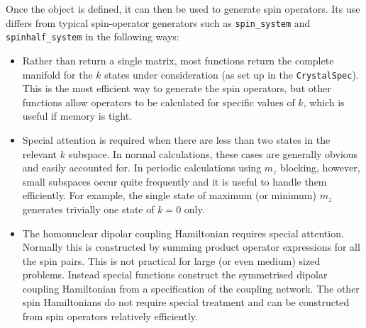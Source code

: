 \documentclass[11pt,a4paper]{article}
\begin{document}
Once the object is defined, it can then be used to generate spin 
operators.  Its use differs from typical
spin-operator generators such as {\tt spin\_system} and {\tt spinhalf\_system}
in the following ways:
\begin{itemize}
\item Rather than return a single matrix, most functions return
the complete manifold for the $k$ states under consideration (as set up
in the {\tt CrystalSpec}).  This is the most efficient way to generate
the spin operators, but other functions allow operators to be calculated
for specific values of $k$, which is useful if memory is tight.

\item Special attention is required when there are less than two states
in the relevant $k$ subspace.  In normal calculations, these cases are
generally obvious and easily accounted for.  In periodic calculations
using $m_z$ blocking, however, small subspaces occur quite frequently and it is useful
to handle them efficiently.  For example, the single state of maximum (or
minimum) $m_z$ generates trivially one state of $k=0$ only.  

\item The homonuclear dipolar coupling Hamiltonian requires special attention.
Normally this is constructed by summing product operator expressions
for all the spin pairs.  This is not practical for large (or even medium)
sized problems.  Instead special functions construct the symmetrised
dipolar coupling Hamiltonian from a specification of the coupling network.
The other spin Hamiltonians do not require special treatment and
can be constructed from spin operators relatively efficiently.
 
\end{itemize}
\end{document}
